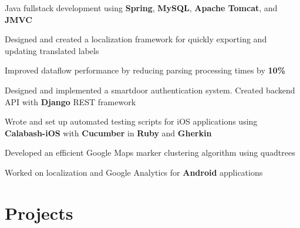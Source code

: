 \documentclass[]{peter_resume}
\begin{document}
\begin{minipage}{\textwidth}
\begin{tightemize}
\item Java fullstack development using \textbf{Spring}, \textbf{MySQL}, \textbf{Apache Tomcat}, and \textbf{JMVC}
\item Designed and created a localization framework for quickly exporting and updating translated labels
\item Improved dataflow performance by reducing parsing processing times by \textbf{10\%}
\end{tightemize}
\sectionsep

\begin{tightemize}
\item Designed and implemented a smartdoor authentication system. Created backend API with \textbf{Django} REST framework
\item Wrote and set up automated testing scripts for iOS applications using \textbf{Calabash-iOS} with \textbf{Cucumber} in \textbf{Ruby} and \textbf{Gherkin}
\item Developed an efficient Google Maps marker clustering algorithm using quadtrees
\item Worked on localization and Google Analytics for \textbf{Android} applications
\end{tightemize}
\sectionsep


\begin{comment}
\runsubsection{Imagine Communications}
\descript{\hfill Application Developer}
\location{May 2014 – Aug 2014 | Waterloo, ON}
\begin{tightemize}
\item Developed an internal progress dashboard to record and monitor employee efficiency using \textbf{AngularJS} and \textbf{Bootstrap}
\item Worked on a \textbf{C\#} API for the progress dashboard
\item Maintained existing software systems by fixing bugs in the Silverlight frontend and \textbf{C\#} backend
\end{tightemize}
\sectionsep
\end{comment}


\section{Projects}


\end{minipage}
\end{document}
